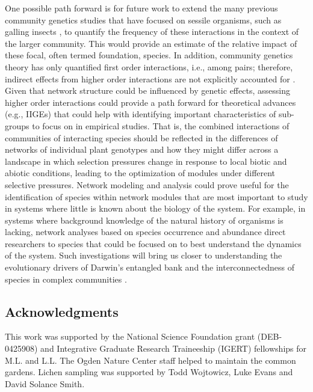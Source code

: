 \documentclass[fleqn,12pt]{olplainarticle}
\begin{document}
One possible path forward is for future work to extend the many
previous community genetics studies that have focused on sessile
organisms, such as galling insects
\citep{Bailey2005ImportanceInteractions, Whitham2006a, Crutsinger2014,
  Smith2011, Keith2017}, to quantify the frequency of these
interactions in the context of the larger community. This would
provide an estimate of the relative impact of these focal, often
termed foundation, species. In addition, community genetics theory has
only quantified first order interactions, i.e., among pairs;
therefore, indirect effects from higher order interactions are not
explicitly accounted for \citep{Shuster2006COMMUNITYSTRUCTURE,
  Whitham2012, Whitham2020IntraspecificEvolution}. Given that network
structure could be influenced by genetic effects, assessing higher
order interactions could provide a path forward for theoretical
advances (e.g., IIGEs) that could help with identifying important
characteristics of sub-groups to focus on in empirical studies. That
is, the combined interactions of communities of interacting species
should be reflected in the differences of networks of individual plant
genotypes and how they might differ across a landscape in which
selection pressures change in response to local biotic and abiotic
conditions, leading to the optimization of modules under different
selective pressures. Network modeling and analysis could prove useful
for the identification of species within network modules that are most
important to study in systems where little is known about the biology
of the system. For example, in systems where background knowledge of
the natural history of organisms is lacking, network analyses based on
species occurrence and abundance direct researchers to species that
could be focused on to best understand the dynamics of the
system. Such investigations will bring us closer to understanding the
evolutionary drivers of Darwin's entangled bank and the
interconnectedness of species in complex communities
\citep{Darwin1859, Dattilo2016fix}.


\subsection*{Acknowledgments}

This work was supported by the National Science Foundation grant
(DEB-0425908) and Integrative Graduate Research Traineeship (IGERT)
fellowships for M.L. and L.L. The Ogden Nature Center staff helped to
maintain the common gardens. Lichen sampling was supported by Todd
Wojtowicz, Luke Evans and David Solance Smith.
\end{document}

